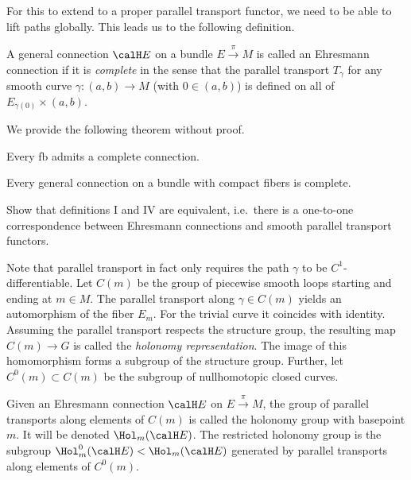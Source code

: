 For this to extend to a proper parallel transport functor, we need to be able to lift paths globally. This leads us to the following definition.

\begin{defn}
    A general connection $\calH E$ on a bundle $E\overset{\pi}{\to}M$ is called an Ehresmann connection if it is \emph{complete} in the sense that the parallel transport $T_\gamma$ for any smooth curve $\gamma:(a,b)\to M$ (with $0\in (a,b)$) is defined on all of $E_{\gamma(0)}\times (a,b)$. 
\end{defn}
We provide the following theorem without proof.
\begin{thm}
    Every \gls{fb} admits a complete connection.
\end{thm}

\begin{example}
    Every general connection on a bundle with compact fibers is complete. 
\end{example}


\begin{xca}
    Show that definitions I and IV are equivalent, i.e.\ there is a one-to-one correspondence between Ehresmann connections and smooth parallel transport functors.
\end{xca}


Note that parallel transport in fact only requires the path $\gamma$ to be $C^1$-differentiable. Let $C(m)$ be the group of piecewise smooth loops starting and ending at $m\in M$. The parallel transport along $\gamma\in C(m)$ yields an automorphism of the fiber $E_m$. For the trivial curve it coincides with identity. Assuming the parallel transport respects the structure group, the resulting map $C(m)\to G$ is called the \emph{holonomy representation}. The image of this homomorphism forms a subgroup of the structure group. Further, let $C^0(m)\subset C(m)$ be the subgroup of nullhomotopic closed curves.

\begin{defn}
    Given an Ehresmann connection $\calH E$ on $E\overset{\pi}{\to}M$, the group of parallel transports along elements of $C(m)$ is called the holonomy group  with basepoint $m$. It will be denoted $\Hol_m(\calH E)$. The restricted holonomy group is the subgroup $\Hol^0_m(\calH E)<\Hol_m(\calH E)$ generated by parallel transports along elements of $C^0(m)$.
\end{defn}

